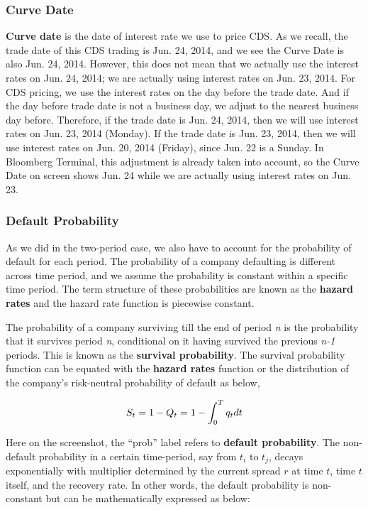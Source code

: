 \documentclass{jss}
\begin{document}
\subsubsection{Curve Date}
\textbf{Curve date} is the date of interest rate we use to price CDS. As we recall, the trade date of this CDS trading is Jun. 24, 2014, and we see the Curve Date is also Jun. 24, 2014. However, this does not mean that we actually use the interest rates on Jun. 24, 2014; we are actually using interest rates on Jun. 23, 2014. For CDS pricing, we use the interest rates on the day before the trade date. And if the day before trade date is not a business day, we adjust to the nearest business day before. Therefore, if the trade date is Jun. 24, 2014, then we will use interest rates on Jun. 23, 2014 (Monday). If the trade date is Jun. 23, 2014, then we will use interest rates on Jun. 20, 2014 (Friday), since Jun. 22 is a Sunday. In Bloomberg Terminal, this adjustment is already taken into account, so the Curve Date on screen shows Jun. 24 while we are actually using interest rates on Jun. 23.
\\
\subsubsection{Default Probability}
\label{sec:DefaultProb}

As we did in the two-period case, we also have to account for the probability of default for each period. The probability of a company defaulting is different across time period, and we assume the probability is constant within a specific time period. The term structure of these probabilities are known as the \textbf{hazard rates} and the hazard rate function is piecewise constant.  

The probability of a company surviving till the end of period \textit{n} is the probability that it survives period \textit{n}, conditional on it having survived the previous \textit{n-1} periods. This is known as the \textbf{survival probability}. The survival probability function can be equated with the \textbf{hazard rates} function or the distribution of the company's risk-neutral probability of default as below,

\begin{displaymath}
S_t = 1 - Q_t = 1 - \int_0^T q_t dt\, \nonumber\\
\end{displaymath}

Here on the screenshot, the ``prob'' label refers to \textbf{default probability}. The non-default probability in a certain time-period, say from $t_i$ to $t_j$, decays exponentially with multiplier determined by the current spread $r$ at time $t$, time $t$ itself, and the recovery rate. In other words, the default probability is non-constant but can be mathematically expressed as below:
\end{document}
